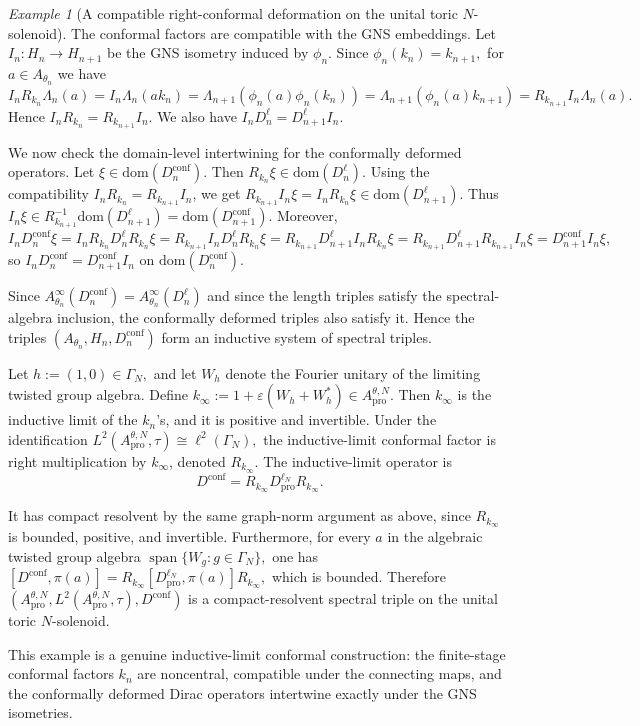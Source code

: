 \documentclass[11pt]{amsart}
\theoremstyle{definition}
\theoremstyle{remark}
\newtheorem{example}[theorem]{Example}
\newcommand{\ex}{\mathrm{pro}}
\newcommand{\dom}{\mathrm{dom}}
\begin{document}
\begin{example}[A compatible right-conformal deformation on the unital toric \(N\)-solenoid]
The conformal factors are compatible with the GNS embeddings. Let $I_n:H_n\to H_{n+1}$
be the GNS isometry induced by $\phi_n$. Since $\phi_n(k_n)=k_{n+1},$
for $a\in A_{\theta_n}$ we have $I_nR_{k_n}\Lambda_n(a)=
I_n\Lambda_n(ak_n)
=\Lambda_{n+1}(\phi_n(a)\phi_n(k_n))=\Lambda_{n+1}(\phi_n(a)k_{n+1})
=R_{k_{n+1}}I_n\Lambda_n(a).$
Hence $I_nR_{k_n}=R_{k_{n+1}}I_n.$ We also have $I_nD_n^\ell=D_{n+1}^\ell I_n.$

We now check the domain-level intertwining for the conformally deformed
operators. Let $\xi\in\dom(D_n^{\mathrm{conf}}).$
Then $R_{k_n}\xi\in\dom(D_n^\ell).$
Using the compatibility $I_nR_{k_n}=R_{k_{n+1}}I_n$, we get $R_{k_{n+1}}I_n\xi=I_nR_{k_n}\xi\in \dom(D_{n+1}^\ell).$
Thus $I_n\xi\in R_{k_{n+1}}^{-1}\dom(D_{n+1}^\ell)=\dom(D_{n+1}^{\mathrm{conf}}).$
Moreover, $
I_nD_n^{\mathrm{conf}}\xi=I_nR_{k_n}D_n^\ell R_{k_n}\xi=R_{k_{n+1}}I_nD_n^\ell R_{k_n}\xi=
R_{k_{n+1}}D_{n+1}^\ell I_nR_{k_n}\xi=
R_{k_{n+1}}D_{n+1}^\ell R_{k_{n+1}}I_n\xi=
D_{n+1}^{\mathrm{conf}}I_n\xi,$
so $I_nD_n^{\mathrm{conf}}
=
D_{n+1}^{\mathrm{conf}}I_n$
on $\dom(D_n^{\mathrm{conf}})$.

Since $A_{\theta_n}^{\infty}(D_n^{\mathrm{conf}})=A_{\theta_n}^{\infty}(D_n^\ell)$
and since the length triples satisfy the spectral-algebra
inclusion, the conformally deformed triples also satisfy it. Hence the triples $(A_{\theta_n},H_n,D_n^{\mathrm{conf}})$
form an inductive system of spectral triples.

Let $h:=(1,0)\in\Gamma_N,$
and let $W_h$ denote the Fourier unitary of the limiting twisted group
algebra. Define $k_\infty:=1+\varepsilon(W_h+W_h^*)\in A_{\ex}^{\theta,N}.$
Then $k_\infty$ is the inductive limit of the $k_n$'s, and it is positive
and invertible. Under the identification $L^2(A_{\ex}^{\theta,N},\tau)\cong \ell^2(\Gamma_N),$
the inductive-limit conformal factor is right multiplication by $k_\infty$,
denoted $R_{k_\infty}.$
The inductive-limit operator is
\[
D^{\mathrm{conf}}
=
R_{k_\infty}D_{\ex}^{\ell_N}R_{k_\infty}.
\]

It has compact resolvent by the same graph-norm argument as above, since $R_{k_\infty}$ is bounded, positive, and invertible. Furthermore, for every
$a$ in the algebraic twisted group algebra $\operatorname{span}\{W_g:g\in\Gamma_N\},$
one has $[D^{\mathrm{conf}},\pi(a)]=R_{k_\infty}[D_\ex^{\ell_N},\pi(a)]R_{k_\infty},$
which is bounded. Therefore $(A_{\ex}^{\theta,N},L^2(A_{\ex}^{\theta,N},\tau),D^{\mathrm{conf}})$
is a compact-resolvent spectral triple on the unital toric $N$-solenoid.

This example is a genuine inductive-limit conformal construction: the
finite-stage conformal factors $k_n$ are noncentral, compatible under the
connecting maps, and the conformally deformed Dirac operators intertwine
exactly under the GNS isometries.
\end{example}
\end{document}
